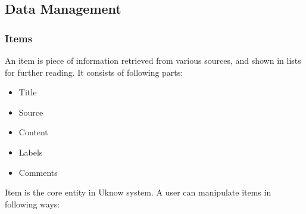 
\subsection{Data Management}

\subsubsection{Items}

An item is piece of information retrieved from various sources, and
shown in lists for further reading. It consists of following parts:

\begin{itemize}
\itemsep1pt\parskip0pt
\item
  Title
\item
  Source
\item
  Content
\item
  Labels
\item
  Comments
\end{itemize}

Item is the core entity in Uknow system. A user can manipulate items in
following ways:

